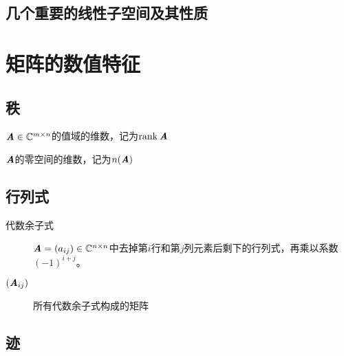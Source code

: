 \begin{definition}
\end{definition}

\subsection{几个重要的线性子空间及其性质}
\label{sub:几个重要的线性子空间及其性质}

\begin{definition}
\end{definition}

\begin{definition}
\end{definition}

\section{矩阵的数值特征}
\label{sec:矩阵的数值特征}

\subsection{秩}
\label{sub:秩}

\begin{definition}[秩]
    $\boldsymbol{\mathit{A}} \in \mathbb{C}^{m \times n}$的值域的维数，记为$\mathrm{rank}\,\boldsymbol{\mathit{A}}$

    $\boldsymbol{\mathit{A}}$的零空间的维数，记为$n(\boldsymbol{\mathit{A}})$
\end{definition}

\begin{definition}
\end{definition}

\subsection{行列式}
\label{sub:行列式}

\begin{definition}
    \begin{description}
        \item[代数余子式] $\boldsymbol{\mathit{A}} = (a_{ij}) \in \mathbb{C}^{n \times n}$中去掉第$i$行和第$j$列元素后剩下的行列式，再乘以系数$(-1)^{i+j}$。
        \item[$(\boldsymbol{\mathit{A}}_{ij})$] 所有代数余子式构成的矩阵
    \end{description}
\end{definition}

\subsection{迹}
\label{sub:迹}

